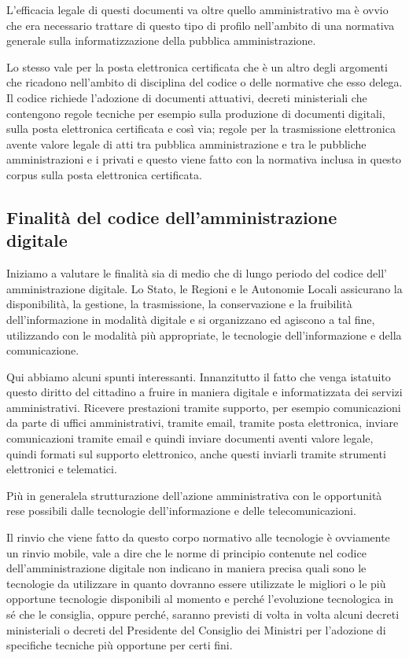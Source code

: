 L'efficacia legale di questi documenti va oltre quello amministrativo ma è ovvio che era necessario trattare di questo tipo di profilo nell'ambito di una normativa generale sulla informatizzazione della pubblica amministrazione. 

Lo stesso vale per la posta elettronica certificata che è un altro degli argomenti che ricadono nell'ambito di disciplina del codice o delle normative che esso delega. 
Il codice richiede l'adozione di documenti attuativi, decreti ministeriali che contengono regole tecniche per esempio sulla produzione di documenti digitali, sulla posta elettronica certificata e così via; regole per la trasmissione elettronica avente valore legale di atti tra pubblica amministrazione e tra le pubbliche amministrazioni e i privati e questo viene fatto con la normativa inclusa in questo corpus sulla posta elettronica certificata.


\subsection{Finalità del codice dell'amministrazione digitale}
Iniziamo a valutare le finalità sia di medio che di lungo periodo del codice dell' amministrazione digitale. Lo Stato, le Regioni e le Autonomie Locali assicurano la disponibilità, la gestione, la trasmissione, la conservazione e la fruibilità dell'informazione in modalità digitale e si organizzano ed agiscono a tal fine, utilizzando con le modalità più appropriate, le tecnologie dell'informazione e della comunicazione.

Qui abbiamo alcuni spunti interessanti. Innanzitutto il fatto che venga istatuito questo diritto del cittadino a fruire in maniera digitale e informatizzata dei servizi amministrativi. Ricevere prestazioni tramite supporto, per esempio comunicazioni da parte di uffici amministrativi, tramite email, tramite posta elettronica, inviare comunicazioni tramite email e quindi inviare documenti aventi valore legale, quindi formati sul supporto elettronico, anche questi inviarli tramite strumenti elettronici e telematici.

Più in generalela strutturazione dell'azione amministrativa con le opportunità rese possibili dalle tecnologie dell'informazione e delle telecomunicazioni. 

Il rinvio che viene fatto da questo corpo normativo alle tecnologie è ovviamente un rinvio mobile, vale a dire che le norme di principio contenute nel codice dell'amministrazione digitale non indicano in maniera precisa quali sono le tecnologie da utilizzare in quanto dovranno essere utilizzate le migliori o le più opportune tecnologie disponibili al momento e perché l'evoluzione tecnologica in sé che le consiglia, oppure perché, saranno previsti di volta in volta alcuni decreti ministeriali o decreti del Presidente del Consiglio dei Ministri per l'adozione di specifiche tecniche più opportune per certi fini. 

